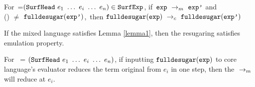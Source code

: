 \begin{lemma}
\label{lemma1}

For~=$(\mbox{\tt SurfHead}~e_1~\ldots~e_i~\ldots~e_n)\in\mbox{\tt SurfExp}$, if~$\mbox{\tt exp} ~\rightarrow_m~\mbox{\tt exp'}$ and\\ () $\not=$ $\mbox{\tt fulldesugar}(\mbox{\tt exp'})$,~then $\mbox{\tt fulldesugar}(\mbox{\tt exp}) ~\rightarrow_c~\mbox{\tt fulldesugar}(\mbox{\tt exp'})$

\end{lemma}

\begin{Def}[Emulation]
If the mixed language satisfies Lemma \ref{lemma1}, then the resugaring satisfies emulation property.
\end{Def}

\begin{lemma}
\label{lemma2}

For~ = $(\mbox{\tt SurfHead}~e_1~\ldots~e_i~\ldots~e_n)$, if inputting $\mbox{\tt fulldesugar}(\mbox{\tt exp})$ to core language's evaluator reduces the term original from $e_i$ in one step, then the $~\rightarrow_m~$ will reduce  at $e_i$.

\end{lemma}

